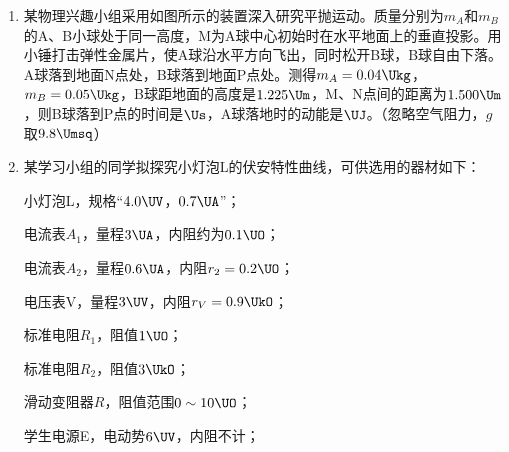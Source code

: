 \documentclass[\gkver]{gaokaozhenti}
\begin{document}
\begin{enumerate}
\item
某物理兴趣小组采用如图所示的装置深入研究平抛运动。质量分别为$m_{A}$和$m_{B}$的A、B小球处于同一高度，M为A球中心初始时在水平地面上的垂直投影。用小锤打击弹性金属片，使A球沿水平方向飞出，同时松开B球，B球自由下落。A球落到地面N点处，B球落到地面P点处。测得$m_{A}=0.04\Ukg$，$m_{B}=0.05\Ukg$，B球距地面的高度是$1.225\Um$，M、N点间的距离为$1.500\Um$，则B球落到P点的时间是\underline{\hspace{1.6cm}}$\Us$，A球落地时的动能是\underline{\hspace{1.6cm}}$\UJ$。（忽略空气阻力，$g$取$9.8\Umsq$）

\item
某学习小组的同学拟探究小灯泡L的伏安特性曲线，可供选用的器材如下：

小灯泡L，规格“$4.0\UV$，$0.7\UA$”；

电流表$A_{1}$，量程$3\UA$，内阻约为$0.1\UO$；

电流表$A_{2}$，量程$0.6\UA$，内阻$r_{2}=0.2\UO$；

电压表V，量程$3\UV$，内阻$r_{V}=0.9\UkO$；

标准电阻$R_{1}$，阻值$1\UO$；

标准电阻$R_{2}$，阻值$3\UkO$；

滑动变阻器$R$，阻值范围$0\sim10\UO$；

学生电源E，电动势$6\UV$，内阻不计；


\end{enumerate}
\end{document}
